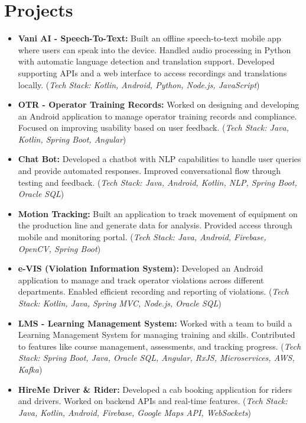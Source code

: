 \documentclass[10pt, a4paper]{article}
\begin{document}
\section*{Projects}
\begin{itemize}[leftmargin=1.5em, itemsep=0.75ex, topsep=0.5ex, label=\textbullet]

\item \textbf{Vani AI - Speech-To-Text: } Built an offline speech-to-text mobile app where users can speak into the device. Handled audio processing in Python with automatic language detection and translation support. Developed supporting APIs and a web interface to access recordings and translations locally. (\textit{Tech Stack: Kotlin, Android, Python, Node.js, JavaScript})

\item \textbf{OTR - Operator Training Records:} Worked on designing and developing an Android application to manage operator training records and compliance. Focused on improving usability based on user feedback. (\textit{Tech Stack: Java, Kotlin, Spring Boot, Angular})

\item \textbf{Chat Bot:} Developed a chatbot with NLP capabilities to handle user queries and provide automated responses. Improved conversational flow through testing and feedback. (\textit{Tech Stack: Java, Android, Kotlin, NLP, Spring Boot, Oracle SQL})

\item \textbf{Motion Tracking:} Built an application to track movement of equipment on the production line and generate data for analysis. Provided access through mobile and monitoring portal. (\textit{Tech Stack: Java, Android, Firebase, OpenCV, Spring Boot})

\item \textbf{e-VIS (Violation Information System):} Developed an Android application to manage and track operator violations across different departments. Enabled efficient recording and reporting of violations. (\textit{Tech Stack: Kotlin, Java, Spring MVC, Node.js, Oracle SQL})

\item \textbf{LMS - Learning Management System:} Worked with a team to build a Learning Management System for managing training and skills. Contributed to features like course management, assessments, and tracking progress. (\textit{Tech Stack: Spring Boot, Java, Oracle SQL, Angular, RxJS, Microservices, AWS, Kafka})

\item \textbf{HireMe Driver \& Rider:} Developed a cab booking application for riders and drivers. Worked on backend APIs and real-time features. (\textit{Tech Stack: Java, Kotlin, Android, Firebase, Google Maps API, WebSockets})


\end{itemize}
\end{document}
